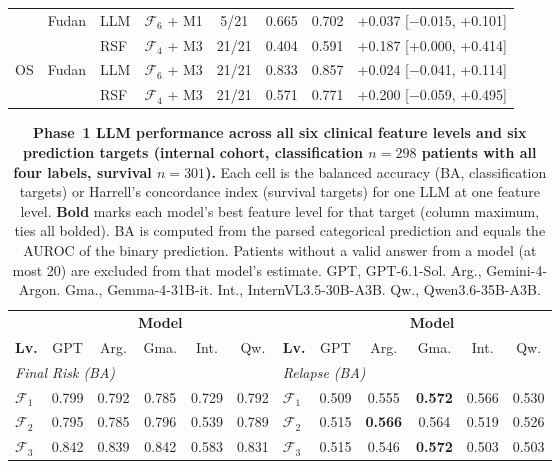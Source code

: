 \documentclass[pdflatex,sn-nature]{sn-jnl}
\begin{document}
\begin{appendices}
\begin{table}[ht]
\begin{tabular}{@{}lllccccc@{}}
 & Fudan & LLM & $\mathcal{F}_6$ + M1 & 5/21 & 0.665 & 0.702 & +0.037 [$-$0.015, +0.101] \\
 &  & RSF & $\mathcal{F}_4$ + M3 & 21/21 & 0.404 & 0.591 & +0.187 [+0.000, +0.414] \\
\addlinespace[2pt]
OS & Fudan & LLM & $\mathcal{F}_6$ + M3 & 21/21 & 0.833 & 0.857 & +0.024 [$-$0.041, +0.114] \\
 &  & RSF & $\mathcal{F}_4$ + M3 & 21/21 & 0.571 & 0.771 & +0.200 [$-$0.059, +0.495] \\
\bottomrule
\end{tabular}
\end{table}


\clearpage

\begin{table}[!t]
\caption{\textbf{Phase~1 LLM performance across all six clinical feature levels and six prediction targets (internal cohort, classification $n=298$ patients with all four labels, survival $n=301$).} Each cell is the balanced accuracy (BA, classification targets) or Harrell's concordance index (survival targets) for one LLM at one feature level. \textbf{Bold} marks each model's best feature level for that target (column maximum, ties all bolded). BA is computed from the parsed categorical prediction and equals the AUROC of the binary prediction. Patients without a valid answer from a model (at most 20) are excluded from that model's estimate. GPT, GPT-6.1-Sol. Arg., Gemini-4-Argon. Gma., Gemma-4-31B-it. Int., InternVL3.5-30B-A3B. Qw., Qwen3.6-35B-A3B.}
\label{tab:phase1_full}
\centering
\footnotesize
\setlength{\tabcolsep}{3.5pt}
\begin{tabular}{@{}l ccccc @{\hskip 1.2em} l ccccc@{}}
\toprule
 & \multicolumn{5}{c}{\textbf{Model}} & & \multicolumn{5}{c}{\textbf{Model}} \\
\cmidrule(lr){2-6}\cmidrule(lr){8-12}
\textbf{Lv.} & GPT & Arg. & Gma. & Int. & Qw. & \textbf{Lv.} & GPT & Arg. & Gma. & Int. & Qw. \\
\midrule
\multicolumn{6}{l}{\textit{Final Risk (BA)}} & \multicolumn{6}{l}{\textit{Relapse (BA)}} \\
$\mathcal{F}_1$ & 0.799 & 0.792 & 0.785 & 0.729 & 0.792 & $\mathcal{F}_1$ & 0.509 & 0.555 & \textbf{0.572} & 0.566 & 0.530 \\
$\mathcal{F}_2$ & 0.795 & 0.785 & 0.796 & 0.539 & 0.789 & $\mathcal{F}_2$ & 0.515 & \textbf{0.566} & 0.564 & 0.519 & 0.526 \\
$\mathcal{F}_3$ & 0.842 & 0.839 & 0.842 & 0.583 & 0.831 & $\mathcal{F}_3$ & 0.515 & 0.546 & \textbf{0.572} & 0.503 & 0.503 \\

\end{tabular}
\end{table}
\end{appendices}
\end{document}
